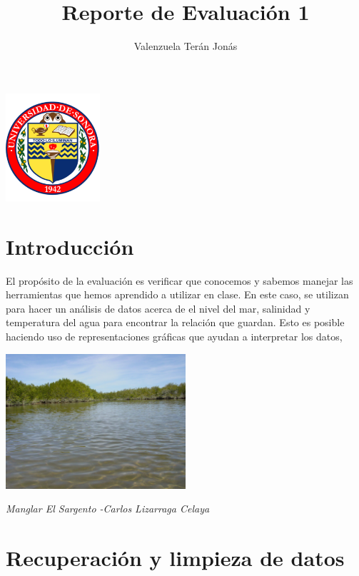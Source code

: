 \documentclass[a4paper]{article}
\title{Reporte de Evaluación 1}
\author{Valenzuela Terán Jonás}
\begin{document}
\maketitle

\begin{center}

	\includegraphics[height=4cm]{Unison.png}

\end{center}


\section{Introducción}

El propósito de la evaluación es verificar que conocemos y sabemos manejar las herramientas que hemos aprendido a utilizar en clase. En este caso, se utilizan para hacer un análisis de datos acerca de el nivel del mar, salinidad y temperatura del agua para encontrar la relación que guardan. Esto es posible haciendo uso de representaciones gráficas que ayudan a interpretar los datos,

\begin{center}

	\includegraphics[height=5cm]{manglar.jpg}
    
    \textit{Manglar El Sargento  -Carlos Lizarraga Celaya}
    
\end{center}


\section{Recuperación y limpieza de datos}
\end{document}
